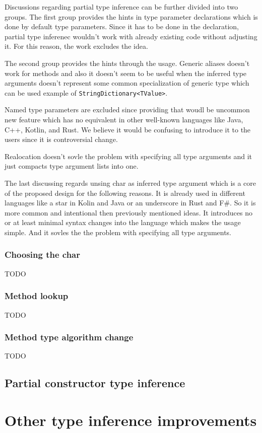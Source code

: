 Discussions regarding partial type inference can be further divided into two groups.
The first group provides the hints in type parameter declarations which is done by default type parameters.
Since it has to be done in the declaration, partial type inferenec wouldn't work with already existing code without adjusting it.
For this reason, the work excludes the idea.
\par
The second group provides the hints through the usage.
Generic aliases doesn't work for methods and also it doesn't seem to be useful when the inferred type arguments doesn't represent some common specialization of generic type which can be used example of \texttt{StringDictionary<TValue>}.
\par
Named type parameters are excluded since providing that woudl be uncommon new feature which has no equivalent in other well-known languages like Java, C++, Kotlin, and Rust.
We believe it would be confusing to introduce it to the users since it is controversial change.
\par
Realocation doesn't sovle the problem with specifying all type arguments and it just compacts type argument lists into one.
\par
The last discussing regards unsing char as inferred type argument which is a core of the proposed design for the following reasons.
It is already used in different languages like a star in Kolin and Java or an underscore in Rust and F\#.
So it is more common and intentional then previously mentioned ideas.
It introduces no or at least minimal syntax changes into the language which makes the usage simple.
And it sovles the the problem with specifying all type arguments.

\subsubsection*{Choosing the char}

TODO

\subsubsection*{Method lookup}

TODO

\subsubsection*{Method type algorithm change}

TODO

\subsection{Partial constructor type inference}


\section{Other type inference improvements}

